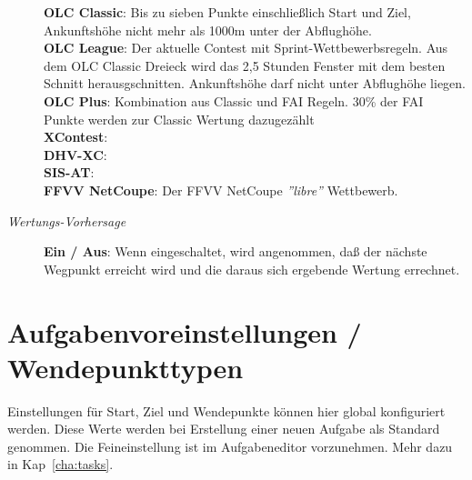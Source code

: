 \begin{description}
   {\bf OLC Classic}: Bis zu sieben Punkte einschließlich Start und Ziel, Ankunftshöhe nicht
   mehr als 1000m unter der Abflughöhe. \\
   {\bf OLC League}: Der aktuelle Contest mit Sprint-Wettbewerbsregeln.
   Aus dem OLC Classic Dreieck wird das 2,5 Stunden Fenster mit dem besten Schnitt herausgschnitten. 
   Ankunftshöhe darf nicht unter Abflughöhe liegen.\\
  {\bf OLC Plus}: Kombination aus Classic und FAI Regeln. 30\% der FAI Punkte werden zur
   Classic Wertung dazugezählt \\
  {\bf XContest}:  \\
  {\bf DHV-XC}:  \\
  {\bf SIS-AT}:  \\
  {\bf FFVV NetCoupe}: Der FFVV NetCoupe {\it ''libre''} Wettbewerb.
\item[\textit{Wertungs-Vorhersage}]  {\bf Ein / Aus}: Wenn eingeschaltet, wird angenommen, daß der nächste Wegpunkt erreicht wird und
die daraus sich ergebende Wertung errechnet.
\end{description}


\section{Aufgabenvoreinstellungen  / Wendepunkttypen}

Einstellungen für Start, Ziel und Wendepunkte können hier global konfiguriert werden.
Diese Werte werden bei Erstellung einer neuen Aufgabe als Standard genommen.
Die Feineinstellung  ist im Aufgabeneditor vorzunehmen.
Mehr dazu in Kap~\ref{cha:tasks}. 


